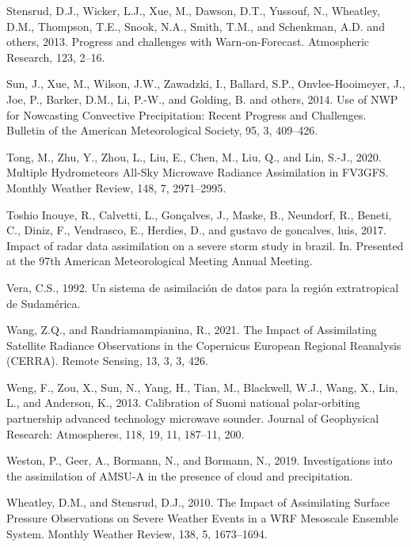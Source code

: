 \documentclass[12pt,oneside]{reedthesis}
\begin{document}
\leavevmode\hypertarget{ref-stensrud2013}{}%
Stensrud, D.J., Wicker, L.J., Xue, M., Dawson, D.T., Yussouf, N., Wheatley, D.M., Thompson, T.E., Snook, N.A., Smith, T.M., and Schenkman, A.D. and others, 2013. Progress and challenges with Warn-on-Forecast. Atmospheric Research, 123, 2--16.

\leavevmode\hypertarget{ref-sun2014}{}%
Sun, J., Xue, M., Wilson, J.W., Zawadzki, I., Ballard, S.P., Onvlee-Hooimeyer, J., Joe, P., Barker, D.M., Li, P.-W., and Golding, B. and others, 2014. Use of NWP for Nowcasting Convective Precipitation: Recent Progress and Challenges. Bulletin of the American Meteorological Society, 95, 3, 409--426.

\leavevmode\hypertarget{ref-tong2020}{}%
Tong, M., Zhu, Y., Zhou, L., Liu, E., Chen, M., Liu, Q., and Lin, S.-J., 2020. Multiple Hydrometeors All-Sky Microwave Radiance Assimilation in FV3GFS. Monthly Weather Review, 148, 7, 2971--2995.

\leavevmode\hypertarget{ref-toshioinouye2017}{}%
Toshio Inouye, R., Calvetti, L., Gonçalves, J., Maske, B., Neundorf, R., Beneti, C., Diniz, F., Vendrasco, E., Herdies, D., and gustavo de goncalves, luis, 2017. Impact of radar data assimilation on a severe storm study in brazil. In. Presented at the 97th American Meteorological Meeting Annual Meeting.

\leavevmode\hypertarget{ref-vera1992}{}%
Vera, C.S., 1992. Un sistema de asimilación de datos para la región extratropical de Sudamérica.

\leavevmode\hypertarget{ref-wang2021}{}%
Wang, Z.Q., and Randriamampianina, R., 2021. The Impact of Assimilating Satellite Radiance Observations in the Copernicus European Regional Reanalysis (CERRA). Remote Sensing, 13, 3, 3, 426.

\leavevmode\hypertarget{ref-weng2013}{}%
Weng, F., Zou, X., Sun, N., Yang, H., Tian, M., Blackwell, W.J., Wang, X., Lin, L., and Anderson, K., 2013. Calibration of Suomi national polar-orbiting partnership advanced technology microwave sounder. Journal of Geophysical Research: Atmospheres, 118, 19, 11, 187--11, 200.

\leavevmode\hypertarget{ref-weston2019}{}%
Weston, P., Geer, A., Bormann, N., and Bormann, N., 2019. Investigations into the assimilation of AMSU-A in the presence of cloud and precipitation.

\leavevmode\hypertarget{ref-wheatley2010}{}%
Wheatley, D.M., and Stensrud, D.J., 2010. The Impact of Assimilating Surface Pressure Observations on Severe Weather Events in a WRF Mesoscale Ensemble System. Monthly Weather Review, 138, 5, 1673--1694.
\end{document}
